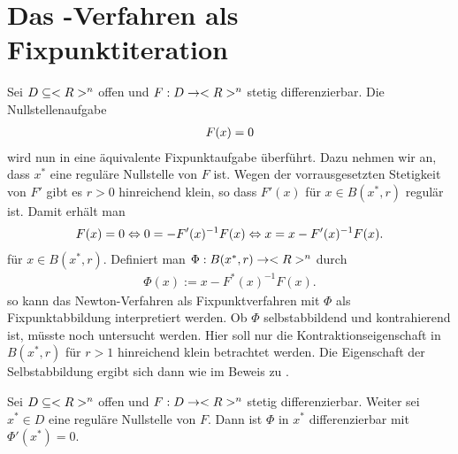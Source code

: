 \section{Das -Verfahren als Fixpunktiteration}

Sei $D \subseteq <R>^n$ offen und $F: D \to <R>^n$ stetig differenzierbar. Die Nullstellenaufgabe
\begin{align}
	F(x) = 0\notag
\end{align}
wird nun in eine äquivalente Fixpunktaufgabe überführt. Dazu nehmen wir an, dass $x^{\ast}$ eine reguläre Nullstelle von $F$ ist. Wegen der vorrausgesetzten Stetigkeit von $F'$ gibt es $r>0$ hinreichend klein, so dass $F'(x)$ für $x \in B(x^{\ast},r)$ regulär ist. Damit erhält man
\begin{align}
	F(x) = 0 \Leftrightarrow 0 = -F'(x)^{-1}F(x) \Leftrightarrow x = x - F'(x)^{-1}F(x).\notag
\end{align}
für $x \in B(x^{\ast},r)$. Definiert man $\Phi: B(x^{\ast},r) \to <R>^n$ durch
\begin{align}
	\Phi(x):= x - F^{\ast}(x)^{-1}F(x). \label{eq_1_3_8}
\end{align}
so kann das Newton-Verfahren als Fixpunktverfahren mit $\Phi$ als Fixpunktabbildung interpretiert werden. Ob $\Phi$ selbstabbildend und kontrahierend ist, müsste noch untersucht werden. Hier soll nur die Kontraktionseigenschaft in $B(x^{\ast},r)$ für $r>1$ hinreichend klein betrachtet werden. Die Eigenschaft der Selbstabbildung ergibt sich dann wie im Beweis zu .

\begin{lemma}
	Sei $D\subseteq <R>^n$ offen und $F: D \to <R>^n$ stetig differenzierbar. Weiter sei $x^{\ast}\in D$ eine reguläre Nullstelle von $F$. Dann ist $\Phi$ in $x^{\ast}$ differenzierbar mit $\Phi'(x^{\ast}) = 0$.
\end{lemma}

